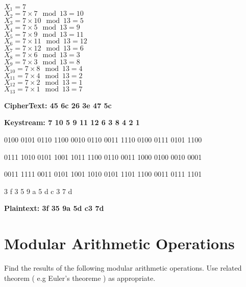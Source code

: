 \documentclass[12]{article}
\begin{document}
\begin{enumerate}
	$X_1  = 7$ \\
	$X_2  = 7 \times 7    \mod 13  = 10$\\
	$X_3  = 7 \times 10   \mod 13  = 5$ \\
	$X_4  = 7 \times 5    \mod 13  = 9$ \\
	$X_5  = 7 \times 9    \mod 13  = 11$ \\
	$X_6  = 7 \times 11   \mod 13  = 12$ \\
	$X_7  = 7 \times 12   \mod 13  = 6$ \\
	$X_8  = 7 \times 6    \mod 13  = 3$ \\
	$X_9  = 7 \times 3    \mod 13  = 8$ \\
	$X_{10} = 7 \times 8  \mod 13  = 4$ \\
	$X_{11} = 7 \times 4  \mod 13  = 2$ \\
	$X_{12} = 7 \times 2  \mod 13  = 1$ \\
	$X_{13} = 7 \times 1  \mod 13 = 7$ 
	
	\textbf{CipherText: 45 6c 26 3e 47 5c }
	
	\textbf{Keystream: 7 10 5 9 11 12 6 3 8 4 2 1 }
	
	\begin{tiny}
		
		0100 0101 0110 1100 0010 0110 0011 1110 0100 0111 0101 1100 
		
		0111 1010 0101 1001 1011 1100 0110 0011 1000 0100 0010 0001 
		
		0011 1111 0011 0101 1001 1010 0101 1101 1100 0011 0111 1101
		
		3	  f     3    5   9    a     5    d   c     3    7   d
		
	\end{tiny}		 
	 
	\textbf{Plaintext: 3f 35 9a 5d c3 7d }
	 
	
\end{enumerate}

\section{ Modular Arithmetic Operations}
	
	Find the results of the following modular arithmetic operations. Use related theorem ( e.g Euler's theoreme ) as appropriate.
	
\end{document}
